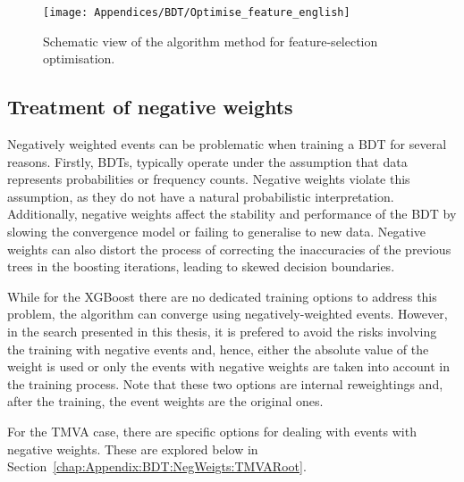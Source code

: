 \begin{figure}[h]
\centering
  \centering
  \texttt{[image: Appendices/BDT/Optimise\_feature\_english]}
\caption{Schematic view of the algorithm method for feature-selection optimisation.}
\label{fig:Appendix:BDT:Feature_loop}
\end{figure}


\subsection{Treatment of negative weights}
\label{chap:Appendix:BDT:NegWeigts}
Negatively weighted events can be problematic when training a BDT
for several reasons.
Firstly, BDTs, typically operate under the assumption that data represents probabilities or 
frequency counts. Negative weights violate this assumption, as they do not have a natural 
probabilistic interpretation.
Additionally, negative weights affect the stability and performance of the BDT by 
slowing the convergence model or failing to generalise to new data. 
Negative weights can also distort the process of  correcting the inaccuracies of
the previous trees in the boosting iterations, leading to skewed decision boundaries. 

While for the XGBoost there are no dedicated training options to address this problem,
the algorithm can converge using negatively-weighted events. However, in the
search presented in this thesis, it is prefered to avoid the risks involving the training with
negative events and, hence, either the absolute value of the weight is used
or only the events with negative weights are taken into account in the training
process. Note that these two options are internal reweightings and, after the
training, the event weights are the original ones. %


For the TMVA case, there are specific options for dealing with events with negative
weights. These are explored below in Section~\ref{chap:Appendix:BDT:NegWeigts:TMVARoot}.


